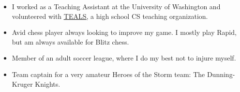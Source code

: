

\begin{cvparagraph}


\begin{justify}
\begin{itemize}[leftmargin=2ex, nosep]
    \setlength{\parskip}{0pt}
    \setlength\itemsep{0.15em}
    \renewcommand{\labelitemi}{\bullet}
    \item I worked as a Teaching Assistant at the University of Washington and volunteered with \href{https://www.microsoft.com/en-us/teals}{\underline{TEALS}}, a high school CS teaching organization. 
    \item Avid chess player always looking to improve my game. I mostly play Rapid, but am always available for Blitz chess.
    \item Member of an adult soccer league, where I do my best not to injure myself.
    \item Team captain for a very amateur Heroes of the Storm team: The Dunning-Kruger Knights.

\end{itemize}
\end{justify}

\end{cvparagraph}
